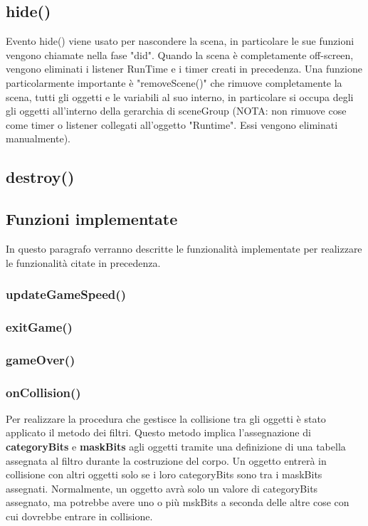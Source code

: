 \documentclass[12pt]{article}
\begin{document}
\subsection{hide()}
Evento hide() viene usato per nascondere la scena, in particolare le sue funzioni vengono chiamate nella fase "did". Quando la scena è completamente off-screen, vengono eliminati i listener RunTime e i timer creati in precedenza. Una funzione particolarmente importante è "removeScene()" che rimuove completamente la scena, tutti gli oggetti e le variabili al suo interno,
in particolare si occupa degli gli oggetti all'interno della gerarchia di sceneGroup (NOTA: non rimuove cose come timer o listener collegati all'oggetto "Runtime". Essi vengono eliminati manualmente).

\subsection{destroy()}

\subsection{Funzioni implementate}
In questo paragrafo verranno descritte le funzionalità implementate per realizzare le funzionalità citate in precedenza.
\subsubsection{updateGameSpeed()}


\subsubsection{exitGame()}

\subsubsection{gameOver()}

\subsubsection{onCollision()}
Per realizzare la procedura che gestisce la collisione tra gli oggetti è stato applicato il metodo dei filtri. 
Questo metodo implica l'assegnazione di \textbf{categoryBits} e \textbf{maskBits} agli oggetti tramite una definizione di una 
tabella assegnata al filtro durante la costruzione del corpo. Un oggetto entrerà in collisione con altri oggetti solo se i loro 
categoryBits sono tra i maskBits assegnati. Normalmente, un oggetto avrà solo un valore di categoryBits assegnato, ma potrebbe avere 
uno o più mskBits a seconda delle altre cose con cui dovrebbe entrare in collisione.
\end{document}
